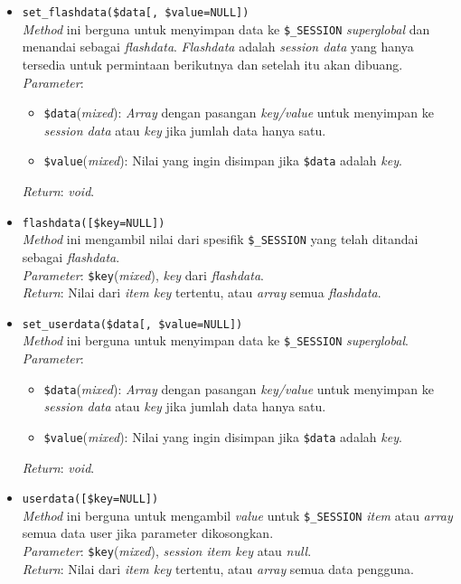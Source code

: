 \begin{itemize}
	\item \texttt{set\_flashdata(\$data[, \$value=NULL])}	\\
	\textit{Method} ini berguna untuk menyimpan data ke \texttt{\$\_SESSION} \textit{superglobal} dan menandai sebagai \textit{flashdata}. \textit{Flashdata} adalah \textit{session data} yang hanya tersedia untuk permintaan berikutnya dan setelah itu akan dibuang.\\
	 \textit{Parameter}: 
	 \begin{itemize}
	 	\item \texttt{\$data}(\textit{mixed}): \textit{Array} dengan pasangan \textit{key/value} untuk menyimpan ke \textit{session data} atau \textit{key} jika jumlah data hanya satu. 
	 	\item \texttt{\$value}(\textit{mixed}): Nilai yang ingin disimpan jika \texttt{\$data} adalah \textit{key}.
	 \end{itemize}
	 \textit{Return}: \textit{void}.
	 
	 \item \texttt{flashdata([\$key=NULL])} \\
	 \textit{Method} ini mengambil nilai dari spesifik \texttt{\$\_SESSION} yang telah ditandai sebagai \textit{flashdata}. \\
	 \textit{Parameter}: \texttt{\$key}(\textit{mixed}), \textit{key} dari \textit{flashdata}. \\
	 \textit{Return}: Nilai dari \textit{item key} tertentu, atau \textit{array} semua \textit{flashdata}.
	
	\item \texttt{set\_userdata(\$data[, \$value=NULL])} \\
	\textit{Method} ini berguna untuk menyimpan data ke \texttt{\$\_SESSION} \textit{superglobal}. \\
	\textit{Parameter}: 
	\begin{itemize}
		\item \texttt{\$data}(\textit{mixed}): \textit{Array} dengan pasangan \textit{key/value} untuk menyimpan ke \textit{session data} atau \textit{key} jika jumlah data hanya satu.
		\item \texttt{\$value}(\textit{mixed}): Nilai yang ingin disimpan jika \texttt{\$data} adalah \textit{key}.
	\end{itemize}
	\textit{Return}: \textit{void}.
	
	\item \texttt{userdata([\$key=NULL])} \\
	\textit{Method} ini berguna untuk mengambil \textit{value} untuk \texttt{\$\_SESSION} \textit{item} atau \textit{array} semua data user jika parameter dikosongkan. \\
	\textit{Parameter}: \texttt{\$key}(\textit{mixed}), \textit{session item key} atau \textit{null}. \\
	\textit{Return}: Nilai dari \textit{item key} tertentu, atau \textit{array} semua data pengguna.
	

\end{itemize}
